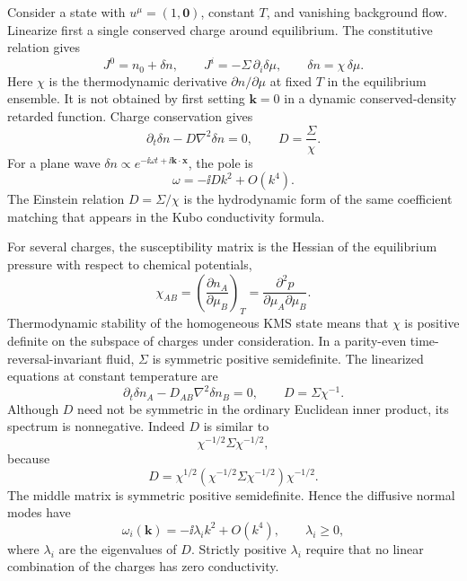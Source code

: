 Consider a state with \(u^\mu=(1,\mathbf0)\), constant \(T\), and vanishing
background flow.  Linearize first a single conserved charge around
equilibrium.  The constitutive relation gives
\[
  J^0=n_0+\delta n,\qquad
  J^i=-\Sigma\,\partial_i\delta\mu,
  \qquad
  \delta n=\chi\,\delta\mu .
\]
Here \(\chi\) is the thermodynamic derivative
\(\partial n/\partial\mu\) at fixed \(T\) in the equilibrium ensemble.  It is
not obtained by first setting \(\mathbf k=0\) in a dynamic conserved-density
retarded function.
Charge conservation gives
\begin{equation}
  \partial_t\delta n-D\nabla^2\delta n=0,
  \qquad
  D=\frac{\Sigma}{\chi}.
  \label{eq:hydro-charge-diffusion-equation}
\end{equation}
For a plane wave \(\delta n\propto e^{-\ii\omega t+\ii\mathbf k\cdot\mathbf x}\),
the pole is
\begin{equation}
  \omega=-\ii D k^2+O(k^4).
  \label{eq:hydro-charge-diffusion-pole}
\end{equation}
The Einstein relation \(D=\Sigma/\chi\) is the hydrodynamic form of the same
coefficient matching that appears in the Kubo conductivity formula.

For several charges, the susceptibility matrix is the Hessian of the
equilibrium pressure with respect to chemical potentials,
\[
  \chi_{AB}
  =
  \left(\frac{\partial n_A}{\partial\mu_B}\right)_T
  =
  \frac{\partial^2p}{\partial\mu_A\partial\mu_B}.
\]
Thermodynamic stability of the homogeneous KMS state means that \(\chi\) is
positive definite on the subspace of charges under consideration.  In a
parity-even time-reversal-invariant fluid, \(\Sigma\) is symmetric positive
semidefinite.  The linearized equations at constant temperature are
\begin{equation}
  \partial_t\delta n_A
  -D_{AB}\nabla^2\delta n_B=0,
  \qquad
  D=\Sigma\chi^{-1}.
  \label{eq:hydro-multicharge-diffusion}
\end{equation}
Although \(D\) need not be symmetric in the ordinary Euclidean inner product,
its spectrum is nonnegative.  Indeed \(D\) is similar to
\[
  \chi^{-1/2}\Sigma\chi^{-1/2},
\]
because
\[
  D
  =
  \chi^{1/2}
  \left(\chi^{-1/2}\Sigma\chi^{-1/2}\right)
  \chi^{-1/2}.
\]
The middle matrix is symmetric positive semidefinite.  Hence the diffusive
normal modes have
\[
  \omega_i(\mathbf k)=-\ii \lambda_i k^2+O(k^4),
  \qquad
  \lambda_i\ge0,
\]
where \(\lambda_i\) are the eigenvalues of \(D\).  Strictly positive
\(\lambda_i\) require that no linear combination of the charges has zero
conductivity.

